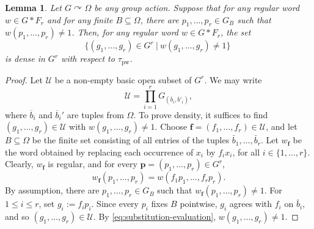\documentclass{article}
\newtheorem{lemma}[theorem]{Lemma}
\theoremstyle{remark}
\theoremstyle{definition}
\def\acts{\curvearrowright}
\DeclareMathOperator{\ppww}{pw}
\newcommand{\pw}{\tau_{\ppww}}
\newcommand{\spOm}{\bm{\Omega}}
\newcommand{\pwom}{\tau_{\ppww}^{\spOm}}
\begin{document}
{\begin{lemma}\label{lemma:slightly technical} 
Let $G\acts\Omega$ be any group action. 
Suppose that for any regular word ${w}\in G* F_r$ and for any finite $B\subseteq \Omega$, there are $p_1, \dots, p_r\in G_B$ such that ${w}(p_1, \dots, p_r)\neq 1$. Then, for any regular word $w\in G* F_r$, the set 
\begin{equation}\label{eq:thesolutionset}
   \{ (g_1, \dots, g_r)\in G^r\ \vert\ w(g_1, \dots, g_r){\neq} 1\}\; 
\end{equation}
{is dense in $G^r$ with respect to $\pw$.}
\end{lemma}
\begin{proof} {Let $\mathcal{U}$ be a non-empty basic open subset of $G^r$. We may write}
\[
  \mathcal{U}
  = \prod_{i=1}^r G_{(\overline{b}_i, \overline{b}'_i)},\]
{where $\overline{b}_i$ and $\overline{b}_i'$ are tuples from $\Omega$.} {To prove density,} it suffices to find $(g_1,\ldots,g_r)\in \mathcal U$ with $w(g_1,\ldots,g_r)\neq 1$. Choose
$\mathbf f=(f_1,\ldots,f_r)\in\mathcal U$, and let $B\subseteq \Omega$ be the
finite set consisting of all entries of the tuples
$\bar b_1,\ldots,\bar b_r$. Let $w_{\mathbf f}$ be the word obtained by {replacing} each occurrence of $x_i$ by $f_ix_i$, for all {$i\in\{1, \dots, r\}$.} Clearly, $w_{\mathbf f}$ is regular, and for every
$\mathbf p=(p_1,\ldots,p_r)\in G^r$, 
\begin{equation}\label{eq:substitution-evaluation}
  w_{\mathbf f}(p_1,\ldots,p_r)
  =w(f_1p_1,\ldots,f_rp_r).
\end{equation}
By assumption, there are
$p_1,\ldots,p_r\in G_B$ such that $w_{\mathbf f}(p_1,\ldots,p_r)\neq 1$.
For  $1\leq i\leq r$, set $g_i:=f_i p_i$. Since every $p_i$ fixes $B$ pointwise, $g_i$ agrees with $f_i$ on
$\bar b_i$, and so $(g_1,\ldots,g_r)\in\mathcal U$. By \eqref{eq:substitution-evaluation}, $w(g_1, \dots, g_r)\neq1$.
\end{proof}


}
\end{document}
